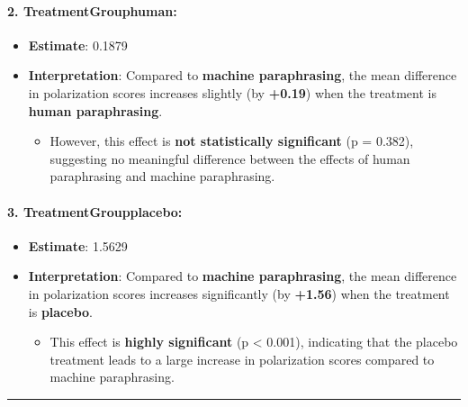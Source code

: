 \documentclass[
]{article}
\providecommand{\tightlist}{%
  \setlength{\itemsep}{0pt}\setlength{\parskip}{0pt}}
\begin{document}
\paragraph{\texorpdfstring{\textbf{2.
TreatmentGrouphuman:}}{2. TreatmentGrouphuman:}}\label{treatmentgrouphuman-1}

\begin{itemize}
\tightlist
\item
  \textbf{Estimate}: 0.1879
\item
  \textbf{Interpretation}: Compared to \textbf{machine paraphrasing},
  the mean difference in polarization scores increases slightly (by
  \textbf{+0.19}) when the treatment is \textbf{human paraphrasing}.

  \begin{itemize}
  \tightlist
  \item
    However, this effect is \textbf{not statistically significant} (p =
    0.382), suggesting no meaningful difference between the effects of
    human paraphrasing and machine paraphrasing.
  \end{itemize}
\end{itemize}

\paragraph{\texorpdfstring{\textbf{3.
TreatmentGroupplacebo:}}{3. TreatmentGroupplacebo:}}\label{treatmentgroupplacebo-3}

\begin{itemize}
\tightlist
\item
  \textbf{Estimate}: 1.5629
\item
  \textbf{Interpretation}: Compared to \textbf{machine paraphrasing},
  the mean difference in polarization scores increases significantly (by
  \textbf{+1.56}) when the treatment is \textbf{placebo}.

  \begin{itemize}
  \tightlist
  \item
    This effect is \textbf{highly significant} (p \textless{} 0.001),
    indicating that the placebo treatment leads to a large increase in
    polarization scores compared to machine paraphrasing.
  \end{itemize}
\end{itemize}

\begin{center}\rule{0.5\linewidth}{0.5pt}\end{center}
\end{document}
